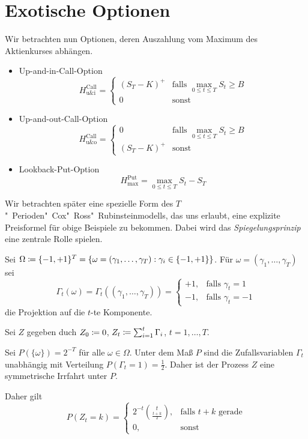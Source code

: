 \documentclass[a4paper,twoside,DIV15,BCOR12mm]{scrbook}
\begin{document}
\section{Exotische Optionen}
Wir betrachten nun Optionen, deren Auszahlung vom Maximum des Aktienkurses abhängen.

\begin{beispiel}
\begin{itemize}
\item Up-and-in-Call-Option
\[
H_{\text{u\&i}}^{\text{Call}} = 
\begin{cases}
(S_T-K)^+ & \text{falls }\max_{0\le t\le T}S_t \ge B \\
0 & \text{sonst}
\end{cases}
\]
\item Up-and-out-Call-Option
\[
H_{\text{u\&o}}^{\text{Call}} = 
\begin{cases}
0 & \text{falls }\max_{0\le t\le T}S_t \ge B \\
(S_T-K)^+ & \text{sonst}
\end{cases}
\]
\item Lookback-Put-Option
\[
H_{\text{max}}^{\text{Put}} =  \max_{0\le t\le T} S_t - S_T
\]
\end{itemize}
\end{beispiel}

Wir betrachten später eine spezielle Form des $T$"~Perioden"~Cox"~Ross"~Rubinsteinmodells, das uns erlaubt, eine explizite Preisformel für obige Beispiele zu bekommen. Dabei wird das \emph{Spiegelungsprinzip} eine zentrale Rolle spielen.

Sei $\Omega \da \{-1,+1\}^T = \{\omega = (\gamma_1,\ldots,\gamma_T): \gamma_i\in\{-1,+1\}\}$. Für $\omega=(\gamma_1,\ldots,\gamma_T)$ sei 
\[
\Gamma_t(\omega) =\Gamma_t( (\gamma_1,\ldots,\gamma_T) ) = 
\begin{cases}
+1, &\text{falls }\gamma_t = 1\\
-1, &\text{falls }\gamma_t = -1
\end{cases}
\]
die Projektion auf die $t$-te Komponente.

Sei $Z$ gegeben duch $Z_0 \da 0$, $Z_t \da \sum_{i=1}^t \Gamma_i$, $t=1,\ldots,T$.

Sei $P(\{\omega\}) = 2^{-T}$ für alle $\omega\in \Omega$.
Unter dem Maß $P$ sind die Zufallsvariablen $\Gamma_t$ unabhängig mit Verteilung $P(\Gamma_t = 1)=\frac12$. Daher ist der Prozess $Z$ eine symmetrische Irrfahrt unter $P$.

Daher gilt 
\[
P(Z_t=k) =
\begin{cases}
2^{-t} \binom{t}{\frac{t+k}2},& \text{falls $t+k$ gerade} \\
0 ,&\text{sonst}
\end{cases}
\]
\end{document}
